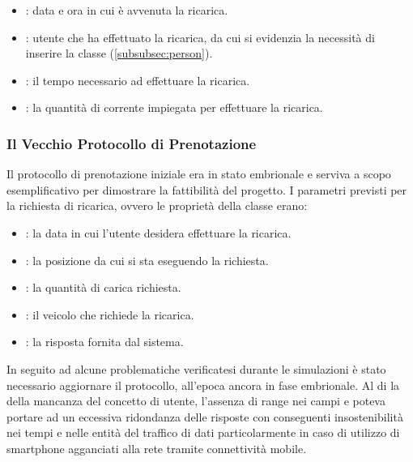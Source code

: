 \begin{itemize}
	\item {}: data e ora in cui è avvenuta la ricarica.
	\item {}: utente che ha effettuato la ricarica, da cui si evidenzia la necessità di inserire la classe  (\ref{subsubsec:person}).
	\item {}: il tempo necessario ad effettuare la ricarica.
	\item {}: la quantità di corrente impiegata per effettuare la ricarica.
\end{itemize}

\subsubsection{Il Vecchio Protocollo di Prenotazione}\label{subsubsec:old-proto}

Il protocollo di prenotazione iniziale era in stato embrionale e serviva a scopo esemplificativo per dimostrare la fattibilità del progetto. I parametri previsti per la richiesta di ricarica, ovvero le proprietà della classe  erano:

\begin{itemize}
	\item {}: la data in cui l'utente desidera effettuare la ricarica.
	\item {}: la posizione da cui si sta eseguendo la richiesta.
	\item {}: la quantità di carica richiesta. 
	\item {}: il veicolo che richiede la ricarica.
	\item {}: la risposta fornita dal sistema.
\end{itemize}

\noindent
In seguito ad alcune problematiche verificatesi durante le simulazioni è stato necessario aggiornare il protocollo, all'epoca ancora in fase embrionale.
Al di la della mancanza del concetto di utente, l'assenza di range nei campi  e  poteva portare ad un eccessiva ridondanza delle risposte con conseguenti insostenibilità nei tempi e nelle entità del traffico di dati particolarmente in caso di utilizzo di smartphone agganciati alla rete tramite connettività mobile.

